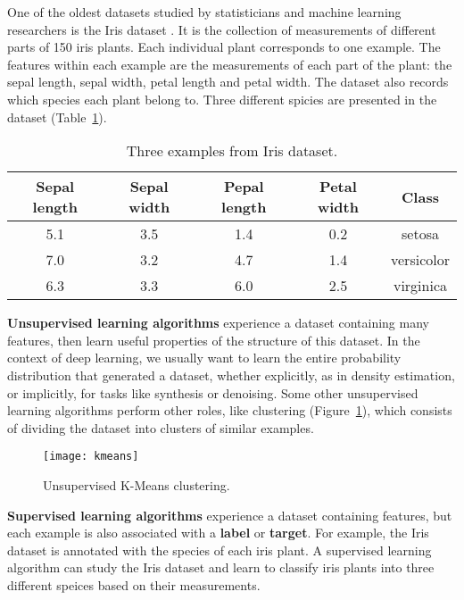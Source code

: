 One of the oldest datasets studied by statisticians and machine learning
researchers is the Iris dataset \cite{fisher1936use}. It is the collection of
measurements of different parts of 150 iris plants. Each individual plant
corresponds to one example. The features within each example are the
measurements of each part of the plant: the sepal length, sepal width, petal
length and petal width. The dataset also records which species each plant
belong to. Three different spicies are presented in the dataset
(Table~\ref{tab:iris_dataset}).
\begin{table}[h]
    \centering
    \begin{tabular}{ |c|c|c|c|c| }
        \hline
        Sepal length & Sepal width & Pepal length & Petal width & Class \\
        \hline
        5.1 & 3.5 & 1.4 & 0.2 & setosa \\
        7.0 & 3.2 & 4.7 & 1.4 & versicolor \\
        6.3 & 3.3 & 6.0 & 2.5 & virginica \\
        \hline
    \end{tabular}
    \caption{Three examples from Iris dataset.}
    \label{tab:iris_dataset}
\end{table}


\textbf{Unsupervised learning algorithms} experience a dataset containing many
features, then learn useful properties of the structure of this dataset. In the
context of deep learning, we usually want to learn the entire probability
distribution that generated a dataset, whether explicitly, as in density
estimation, or implicitly, for tasks like synthesis or denoising. Some other
unsupervised learning algorithms perform other roles, like clustering
(Figure~\ref{fig:kmeans}), which consists of dividing the dataset into clusters
of similar examples.
\begin{figure}[h]
    \centering
    \texttt{[image: kmeans]}
    \caption{Unsupervised K-Means clustering.}
    \label{fig:kmeans}
\end{figure}


\textbf{Supervised learning algorithms} experience a dataset containing
features, but each example is also associated with a \textbf{label} or
\textbf{target}. For example, the Iris dataset is annotated with the species of
each iris plant. A supervised learning algorithm can study the Iris dataset and
learn to classify iris plants into three different speices based on their
measurements.


